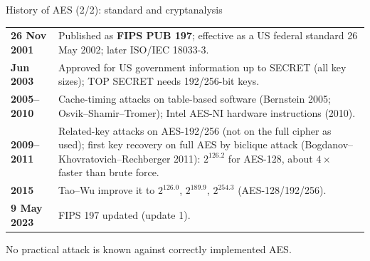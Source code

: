 \documentclass[aspectratio=169,10pt]{beamer}
\begin{document}
\begin{frame}{History of AES (2/2): standard and cryptanalysis}
\footnotesize
\renewcommand{\arraystretch}{1.18}
\begin{tabular}{@{}>{\bfseries}p{2.3cm}p{9.3cm}@{}}
\toprule
26 Nov 2001 & Published as \textbf{FIPS PUB 197}; effective as a US federal standard 26 May 2002; later ISO/IEC 18033-3. \\
Jun 2003 & Approved for US government information up to SECRET (all key sizes); TOP SECRET needs 192/256-bit keys. \\
2005--2010 & Cache-timing attacks on table-based software (Bernstein 2005; Osvik--Shamir--Tromer); Intel AES-NI hardware instructions (2010). \\
2009--2011 & Related-key attacks on AES-192/256 (not on the full cipher as used); first key recovery on full AES by biclique attack (Bogdanov--Khovratovich--Rechberger 2011): $2^{126.2}$ for AES-128, about $4\times$ faster than brute force. \\
2015 & Tao--Wu improve it to $2^{126.0}$, $2^{189.9}$, $2^{254.3}$ (AES-128/192/256). \\
9 May 2023 & FIPS 197 updated (update 1). \\
\bottomrule
\end{tabular}
\vskip4pt
\begin{ibox}\small No practical attack is known against correctly implemented AES.\end{ibox}
\end{frame}
\end{document}
